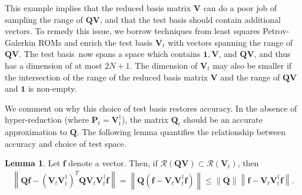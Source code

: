 \documentclass[preprint,10pt]{elsarticle}
\theoremstyle{definition}
\theoremstyle{lemma}
\newtheorem{lemma}{Lemma}
\theoremstyle{theorem}
\theoremstyle{assumption}
\newcommand{\diag}[1]{{\rm diag}\LRp{#1}}
\newcommand{\td}[2]{\frac{{\rm d}#1}{{\rm d}{\rm #2}}}
\newcommand{\pd}[2]{\frac{\partial#1}{\partial#2}}
\newcommand{\nor}[1]{\left\| #1 \right\|}
\newcommand{\LRp}[1]{\left( #1 \right)}
\begin{document}
This example implies that the reduced basis matrix $\bm{V}$ can do a poor job of sampling the range of $\bm{Q}\bm{V}$, and that the test basis should contain additional vectors.  To remedy this issue, we borrow techniques from least squares Petrov-Galerkin ROMs \cite{carlberg2011efficient, carlberg2017galerkin} and enrich the test basis $\bm{V}_t$ with vectors spanning the range of $\bm{Q}\bm{V}$.  The test basis now spans a space which contains $\bm{1}, \bm{V}$, and $\bm{Q}\bm{V}$, and thus has a dimension of at most $2N+1$.  The dimension of $\bm{V}_t$ may also be smaller if the intersection of the range of the reduced basis matrix $\bm{V}$ and the range of $\bm{Q}\bm{V}$ and $\bm{1}$ is non-empty.  

We comment on why this choice of test basis restores accuracy.  
In the absence of hyper-reduction (where $\bm{P}_t = \bm{V}_t^{\dagger}$), the matrix $\bm{Q}_t$ should be an accurate approximation to $\bm{Q}$.  The following lemma quantifies the relationship between accuracy and choice of test space.
\begin{lemma}
\label{thm:acc}
Let $\bm{f}$ denote a vector.  Then, if $\mathcal{R}\LRp{\bm{Q}\bm{V}} \subset \mathcal{R}\LRp{\bm{V}_t}$, then
\begin{align*}
\nor{\bm{Q}\bm{f} - \LRp{\bm{V}_t\bm{V}_t^{\dagger}}^T\bm{Q}\bm{V}_t\bm{V}_t^{\dagger}\bm{f}} = \nor{\bm{Q}\LRp{\bm{f}-\bm{V}_t\bm{V}_t^{\dagger}\bm{f}}} \leq \nor{\bm{Q}}\nor{\bm{f}-\bm{V}_t\bm{V}_t^{\dagger}\bm{f}}.
\end{align*}
\end{lemma}
\end{document}
